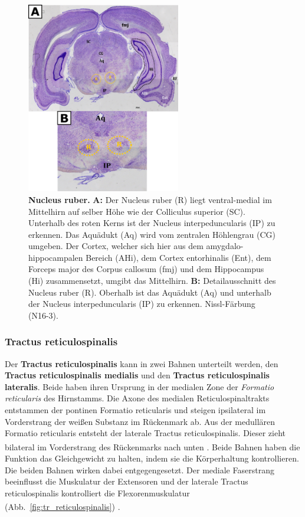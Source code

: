 \documentclass[12pt,a4paper,pdftex]{article}
\begin{document}
\begin{figure}[H]
    \centering
    \includegraphics[width=0.6\textwidth]{pictures/Bilder_Laura/red_nucleus_N16_3P_025x.png}
    \caption[Nucleus ruber]{\textbf{Nucleus ruber.} \textbf{A:} Der Nucleus ruber (R) liegt ventral-medial im Mittelhirn auf selber Höhe wie der Colliculus superior (SC). Unterhalb des roten Kerns ist der Nucleus interpeduncularis (IP) zu erkennen. Das Aquädukt (Aq) wird vom zentralen Höhlengrau (CG) umgeben. Der Cortex, welcher sich hier aus dem  amygdalo-hippocampalen Bereich (AHi), dem Cortex entorhinalis (Ent), dem Forceps major des Corpus callosum (fmj) und dem Hippocampus (Hi) zusammensetzt, umgibt das Mittelhirn. \textbf{B:} Detailausschnitt des Nucleus ruber (R). Oberhalb ist das Aquädukt (Aq) und unterhalb der Nucleus interpeduncularis (IP) zu erkennen. Nissl-Färbung (N16-3).}
    \label{fig:roter_Kern}
\end{figure}

\subsubsection{Tractus reticulospinalis}  \label{subsubsec:reticulospinalis}
Der \textbf{Tractus reticulospinalis} kann in zwei Bahnen unterteilt werden, den \textbf{Tractus reticulospinalis medialis} und den \textbf{Tractus reticulospinalis lateralis}. Beide haben ihren Ursprung in der medialen Zone der \textit{Formatio reticularis} des Hirnstamms. Die Axone des medialen Reticulospinaltrakts entstammen der pontinen Formatio reticularis und steigen ipsilateral im Vorderstrang der weißen Substanz im Rückenmark ab. Aus der medullären Formatio reticularis entsteht der laterale Tractus reticulospinalis. Dieser zieht bilateral im Vorderstrang des Rückenmarks nach unten \textsuperscript{\cite[8]{crossman2014neuroanatomy}}. Beide Bahnen haben die Funktion das Gleichgewicht zu halten, indem sie die Körperhaltung kontrollieren. Die beiden Bahnen wirken dabei entgegengesetzt. Der mediale Faserstrang beeinflusst die Muskulatur der Extensoren und der laterale Tractus reticulospinalis kontrolliert die Flexorenmuskulatur (Abb.~\ref{fig:tr_reticulospinalis}) \textsuperscript{\cite[14]{neurowissenschaften_baer}}.
\end{document}
